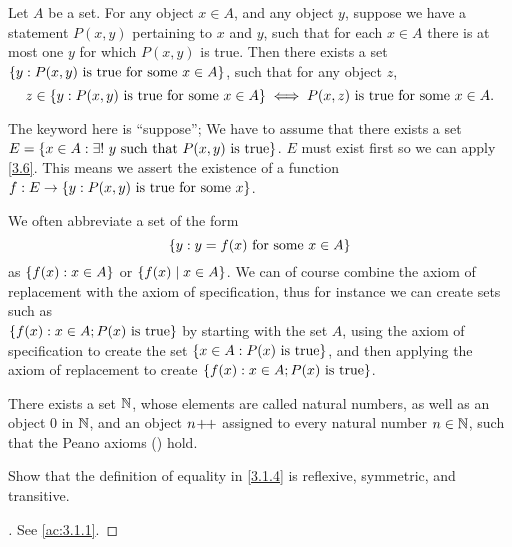 \begin{ax}[Replacement]\label{3.6}
  Let \(A\) be a set.
  For any object \(x \in A\), and any object \(y\), suppose we have a statement \(P(x, y)\) pertaining to \(x\) and \(y\), such that for each \(x \in A\) there is at most one \(y\) for which \(P(x, y)\) is true.
  Then there exists a set \(\left\lbrace y : P(x, y) \text{ is true for some } x \in A\right\rbrace\), such that for any object \(z\),
  \[
    z \in \left\lbrace y: P(x, y) \text{ is true for some } x \in A\right\rbrace \iff P(x, z) \text{ is true for some } x \in A.
  \]
\end{ax}

\begin{note}
  The keyword here is ``suppose'';
  We have to assume that there exists a set \(E = \left\lbrace x \in A : \exists!\ y \text{ such that } P(x, y) \text{ is true}\right\rbrace\).
  \(E\) must exist first so we can apply \cref{3.6}.
  This means we assert the existence of a function \(f : E \to \left\lbrace y : P(x, y) \text{ is true for some } x\right\rbrace\).
\end{note}

\begin{note}
  We often abbreviate a set of the form
  \[
    \left\lbrace y : y = f(x) \text{ for some } x \in A\right\rbrace
  \]
  as \(\left\lbrace f(x) : x \in A\right\rbrace\) or \(\left\lbrace f(x) \mid x \in A\right\rbrace\).
  We can of course combine the axiom of replacement with the axiom of specification, thus for instance we can create sets such as \\
  \(\left\lbrace f(x) : x \in A; P(x) \text{ is true}\right\rbrace\) by starting with the set \(A\), using the axiom of specification to create the set \(\left\lbrace x \in A : P(x) \text{ is true}\right\rbrace\), and then applying the axiom of replacement to create \(\left\lbrace f(x) : x \in A; P(x) \text{ is true}\right\rbrace\).
\end{note}

\begin{ax}[Infinity]\label{3.7}
  There exists a set \(\mathbb{N}\), whose elements are called natural numbers, as well as an object \(0\) in \(\mathbb{N}\), and an object \(n\!+\!\!+\) assigned to every natural number \(n \in \mathbb{N}\), such that the Peano axioms () hold.
\end{ax}

\exercisesection

\begin{ex}\label{ex:3.1.1}
  Show that the definition of equality in \cref{3.1.4} is reflexive, symmetric, and transitive.
\end{ex}

\begin{proof}[]
  See \cref{ac:3.1.1}.
\end{proof}

